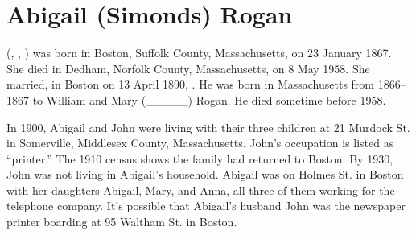 \section{Abigail (Simonds) Rogan}\label{per:Abigail4Simonds}

 (, , ) was born in Boston, Suffolk County, Massachusetts, on 23 January 1867.\cite{Abigail4SimondsBirth} She died in Dedham, Norfolk County, Massachusetts, on 8 May 1958.\cite{Abigail4SimondsDeath:1} She married, in Boston on 13 April 1890, . He was born in Massachusetts from 1866--1867 to William and Mary (\_\_\_\_\_) Rogan.\cite{Census1880JohnRogan} He died sometime before 1958.\cite{Abigail4SimondsDeath:2}

In 1900, Abigail and John were living with their three children at 21 Murdock St. in Somerville, Middlesex County, Massachusetts. John's occupation is listed as ``printer.''\cite{Census1900AbigailSimonds} The 1910 census shows the family had returned to Boston.\cite{Census1910AbigailSimonds} By 1930, John was not living in Abigail's household. Abigail was on Holmes St. in Boston with her daughters Abigail, Mary, and Anna, all three of them working for the telephone company.\cite{Census1930AbigailSimonds} It's possible that Abigail's husband John was the newspaper printer boarding at 95 Waltham St. in Boston.\cite{Census1930JohnRogan}

